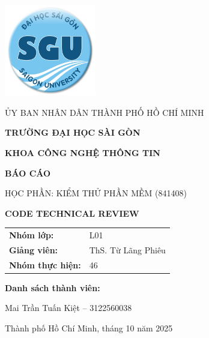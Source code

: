 \documentclass[11pt, a4paper]{report}
\begin{document}
\begin{titlepage}
    \centering
    \sffamily

    \includegraphics[width=0.3\textwidth]{images/logo_sgu.png}
    \vspace{1cm}

    {\Large ỦY BAN NHÂN DÂN THÀNH PHỐ HỒ CHÍ MINH\par}
    {\LARGE \textbf{TRƯỜNG ĐẠI HỌC SÀI GÒN}\par}
    {\Large \textbf{KHOA CÔNG NGHỆ THÔNG TIN}\par}

    \vfill

    {\Huge \textbf{BÁO CÁO}}\par
    \vspace{0.5cm}
    {\Large HỌC PHẦN: KIỂM THỬ PHẦN MỀM (841408)}\par
    
    \vspace{1cm}
    {\Huge \textbf{CODE TECHNICAL REVIEW}}\par

    \vfill

    \begin{flushright}
    \large
    \begin{tabular}{ll}
        \textbf{Nhóm lớp:} & L01 \\
        \textbf{Giảng viên:} & ThS. Từ Lãng Phiêu \\
        \textbf{Nhóm thực hiện:} & 46 \\
    \end{tabular}
    \end{flushright}

    \vspace{0.5cm}

    \textbf{\large Danh sách thành viên:}\par
    \large Mai Trần Tuấn Kiệt – 3122560038\par

    \vfill

    {\large Thành phố Hồ Chí Minh, tháng 10 năm 2025\par}
\end{titlepage}

\tableofcontents
\newpage






\end{document}
